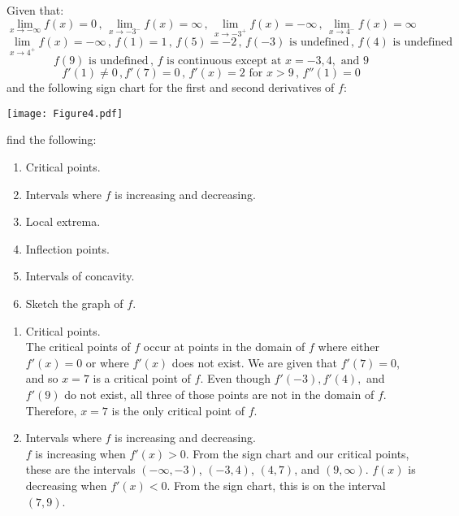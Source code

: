 \documentclass[nooutcomes]{ximera}
\renewenvironment{freeResponse}{
\ifhandout\setbox0\vbox\bgroup\else
\begin{trivlist}\item[\hskip \labelsep\bfseries Solution:\hspace{2ex}]
\fi}
{\ifhandout\egroup\else
\end{trivlist}
\fi}
\begin{document}
\begin{problem}
Given that:
$$ \lim_{x \to - \infty} f(x) = 0 \, , \, \lim_{x \to -3^-} f(x) = \infty \, , \, \lim_{x \to -3^+} f(x) = - \infty \, , \, \lim_{x \to 4^-} f(x) = \infty $$
$$ \lim_{x \to 4^+} f(x) = -\infty \, , \, f(1) = 1 \, , \, f(5) = -2 \, , \, f(-3) \text{ is undefined} \, , \, f(4) \text{ is undefined} $$
$$ f(9) \text{ is undefined} \, , \, f \text{ is continuous except at } x=-3, 4, \text{ and } 9 $$
$$ f'(1) \ne 0\, ,f'(7) = 0 \, , \, f'(x) = 2 \text{ for } x > 9 \, , \, f''(1) = 0 $$
and the following sign chart for the first and second derivatives of $f$:

	\begin{image}
	\texttt{[image: Figure4.pdf]}
	\end{image}
	
find the following:
	\begin{enumerate}
	
	\item  Critical points.
	\item  Intervals where $f$ is increasing and decreasing.
	\item  Local extrema.
	\item  Inflection points.
	\item  Intervals of concavity.
	\item  Sketch the graph of $f$.
	
	\end{enumerate}
	
		\begin{freeResponse}
		
			\begin{enumerate}
			
			\item  Critical points. \\
			The critical points of $f$ occur at points in the domain of $f$ where either $f'(x)=0$ or where $f'(x)$ does not exist.  We are given that $f'(7)=0$, and so $x=7$ is a critical point of $f$.  Even though $f'(-3), f'(4),$ and $f'(9)$ do not exist, all three of those points are not in the domain of $f$.  Therefore, $x=7$ is the only critical point of $f$.  
			
			\item  Intervals where $f$ is increasing and decreasing.  \\
			$f$ is increasing when $f'(x)>0$.  From the sign chart and our critical points, these are the intervals $(-\infty ,-3)$, $(-3,4)$, $(4,7)$, and $(9,\infty )$. 
$f(x)$ is decreasing when $f'(x)<0$.  From the sign chart, this is on the interval $(7,9)$.
			

\end{enumerate}
\end{freeResponse}
\end{problem}
\end{document}
